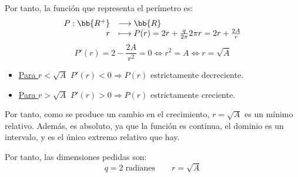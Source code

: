 \begin{ejercicio}
    Por tanto, la función que representa el perímetro es:
    \begin{equation*}
        \begin{array}{rl}
            P:\bb{R^+} & \longrightarrow \bb{R}\\
                    r & \longmapsto P(r)= 2r + \frac{q}{2\pi}2\pi r = 2r + \frac{2A}{r}
        \end{array}
    \end{equation*}
    \begin{equation*}
        P'(r)=2 -\frac{2A}{r^2} = 0 \Longleftrightarrow r^2=A \Longleftrightarrow r=\sqrt{A}
    \end{equation*}
    \begin{itemize}
        \item \underline{Para $r<\sqrt{A}$} $P'(r)<0 \Longrightarrow P(r)$ estrictamente decreciente.
        \item \underline{Para $r>\sqrt{A}$} $P'(r)>0 \Longrightarrow P(r)$ estrictamente creciente.
    \end{itemize}
    Por tanto, como se produce un cambio en el crecimiento, $r=\sqrt{A}$ es un mínimo relativo. Además, es absoluto, ya que la función es continua, el dominio es un intervalo, y es el único extremo relativo que hay.
    
    Por tanto, las dimensiones pedidas son:
    \begin{equation*}
        q=2\;\text{radianes} \qquad r=\sqrt{A}
    \end{equation*}
\end{ejercicio}

